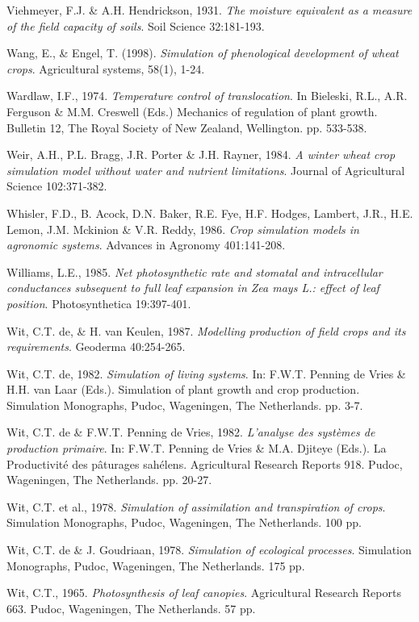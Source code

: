 Viehmeyer, F.J. \& A.H. Hendrickson, 1931. {\it The moisture equivalent as a measure of the field
capacity of soils\/}. Soil Science 32:181-193.

Wang, E., \& Engel, T. (1998). {\it Simulation of phenological development of wheat crops}. Agricultural systems, 58(1), 1-24.

Wardlaw, I.F., 1974. {\it Temperature control of translocation\/}. In Bieleski, R.L., A.R. Ferguson \&
M.M. Creswell (Eds.) Mechanics of regulation of plant growth. Bulletin 12, The Royal Society of
New Zealand, Wellington. pp. 533-538.

Weir, A.H., P.L. Bragg, J.R. Porter \& J.H. Rayner, 1984. {\it A winter wheat crop simulation model
without water and nutrient limitations\/}. Journal of Agricultural Science 102:371-382.

Whisler, F.D., B. Acock, D.N. Baker, R.E. Fye, H.F. Hodges, Lambert, J.R., H.E. Lemon, J.M.
Mckinion \& V.R. Reddy, 1986. {\it Crop simulation models in agronomic systems\/}. Advances in
Agronomy 401:141-208.

Williams, L.E., 1985. {\it Net photosynthetic rate and stomatal and intracellular conductances
subsequent to full leaf expansion in Zea mays L.: effect of leaf position\/}. Photosynthetica 19:397-401.

Wit, C.T. de, \& H. van Keulen, 1987. {\it Modelling production of field crops and its requirements\/}.
Geoderma 40:254-265.

 Wit, C.T. de, 1982. {\it Simulation of living systems\/}. In: F.W.T. Penning de Vries \& H.H. van Laar
(Eds.). Simulation of plant growth and crop production. Simulation Monographs, Pudoc,
Wageningen, The Netherlands. pp. 3-7.

Wit, C.T. de \& F.W.T. Penning de Vries, 1982. {\it L'analyse des syst\`{e}mes de production primaire\/}.
In: F.W.T. Penning de Vries \& M.A. Djiteye (Eds.). La Productivit\'{e} des p\^{a}turages sah\'{e}lens.
Agricultural Research Reports 918. Pudoc, Wageningen, The Netherlands. pp. 20-27.

Wit, C.T. et al., 1978. {\it Simulation of assimilation and transpiration of crops\/}. Simulation
Monographs, Pudoc, Wageningen, The Netherlands. 100 pp.

Wit, C.T. de \& J. Goudriaan, 1978. {\it Simulation of ecological processes\/}. Simulation Monographs,
Pudoc, Wageningen, The Netherlands. 175 pp.

Wit, C.T., 1965. {\it Photosynthesis of leaf canopies\/}. Agricultural Research Reports 663. Pudoc,
Wageningen, The Netherlands. 57 pp.

